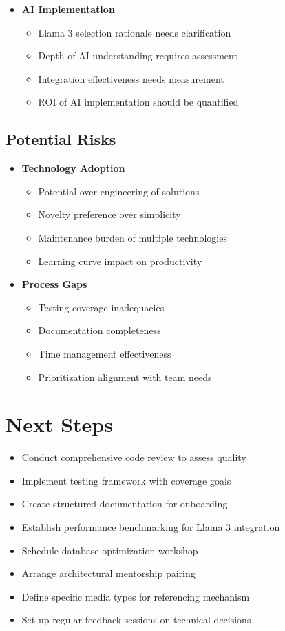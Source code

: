 \documentclass[10pt,a4paper]{article}
\begin{document}
\begin{multicols}{2}
\begin{itemize}
  \item \textbf{AI Implementation}
    \begin{itemize}
      \item Llama 3 selection rationale needs clarification
      \item Depth of AI understanding requires assessment
      \item Integration effectiveness needs measurement
      \item ROI of AI implementation should be quantified
    \end{itemize}
\end{itemize}

\subsection*{Potential Risks}
\begin{itemize}\small
  \item \textbf{Technology Adoption}
    \begin{itemize}
      \item Potential over-engineering of solutions
      \item Novelty preference over simplicity
      \item Maintenance burden of multiple technologies
      \item Learning curve impact on productivity
    \end{itemize}
  
  \item \textbf{Process Gaps}
    \begin{itemize}
      \item Testing coverage inadequacies
      \item Documentation completeness
      \item Time management effectiveness
      \item Prioritization alignment with team needs
    \end{itemize}
\end{itemize}

\section*{Next Steps}
\begin{itemize}\small
  \item Conduct comprehensive code review to assess quality
  \item Implement testing framework with coverage goals
  \item Create structured documentation for onboarding
  \item Establish performance benchmarking for Llama 3 integration
  \item Schedule database optimization workshop
  \item Arrange architectural mentorship pairing
  \item Define specific media types for referencing mechanism
  \item Set up regular feedback sessions on technical decisions
\end{itemize}


\end{multicols}
\end{document}
